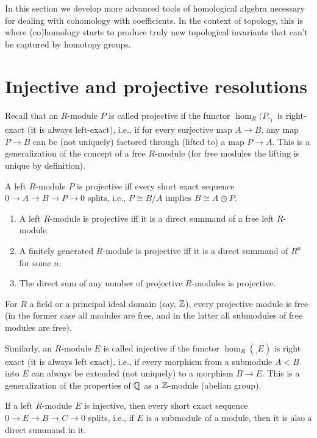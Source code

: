 In this section we develop more advanced tools of homological algebra necessary for dealing with cohomology with coefficients. In the context of topology, this is where (co)homology starts to produce truly new topological invariants that can't be captured by homotopy groups.

\section{Injective and projective resolutions}


Recall that an  $R$-module $P$ is called projective if the functor $\hom_R(P,_)$ is right-exact (it is always left-exact), i.e., if for every surjective map $A\to B$, any map $P\to B$ can be (not uniquely) factored through (lifted to) a map $P\to A$. This is a generalization of the concept of a free $R$-module (for free modules the lifting is unique by definition).

\begin{prop}
    A left $R$-module $P$ is projective iff every short exact sequence $0\to A\to B\to P\to 0$ splits, i.e., $P\cong B/A$ implies $B\cong A\oplus P$.
\end{prop}

\begin{thm}
    \begin{enumerate}
        \item A left $R$-module is projective iff it is a direct summand of a free left $R$-module.
        \item A finitely generated $R$-module  is projective iff it is a direct summand of $R^n$ for some $n$.
        \item The direct sum of any number of projective $R$-modules is projective.
    \end{enumerate}
\end{thm}

For $R$ a field or a principal ideal domain (say, $\mathbb{Z}$), every projective module is free (in the former case all modules are free, and in the latter all submodules of free modules are free).


Similarly, an $R$-module $E$ is called injective if the functor $\hom_R(_,E)$ is right exact (it is always left exact), i.e., if every morphism from a submodule $A<B$ into $E$ can always be extended (not uniquely) to a morphism $B\to E$. This is a generalization of the properties of $\mathbb{Q}$ as a $\mathbb{Z}$-module (abelian group).

\begin{prop}
    If a left $R$-module $E$ is injective, then every short exact sequence $0\to E\to B\to C\to 0$ splits, i.e., if $E$ is a submodule of a module, then it is also a direct summand in it.
\end{prop}

